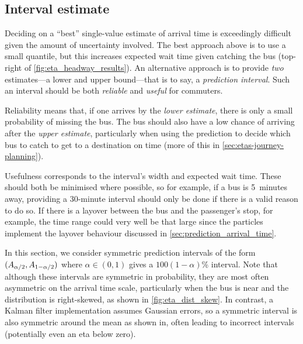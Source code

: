 \subsection{Interval estimate}
\label{sec:etas-interval}


Deciding on a ``best'' single-value estimate of arrival time is exceedingly difficult given the amount of uncertainty involved. The best approach above is to use a small quantile, but this increases expected wait time given catching the bus (top-right of \cref{fig:eta_headway_results}). An alternative approach is to provide \emph{two} estimates---a lower and upper bound---that is to say, a \emph{prediction interval}. Such an interval should be both \emph{reliable} and \emph{useful} for commuters.

Reliability means that, if one arrives by the \emph{lower estimate}, there is only a small probability of missing the bus. The bus should also have a low chance of arriving after the \emph{upper estimate}, particularly when using the prediction to decide which bus to catch to get to a destination on time (more of this in \cref{sec:etas-journey-planning}).

Usefulness corresponds to the interval's width and expected wait time. These should both be minimised where possible, so for example, if a bus is 5~minutes away, providing a 30-minute interval should only be done if there is a valid reason to do so. If there is a layover between the bus and the passenger's stop, for example, the time range could very well be that large since the particles implement the layover behaviour discussed in \cref{sec:prediction_arrival_time}.







In this section, we consider symmetric prediction intervals of the form $(A_{\alpha/2}, A_{1-\alpha/2})$ where $\alpha \in (0,1)$ gives a $100(1-\alpha)$\% interval. Note that although these intervals are symmetric in probability, they are most often asymmetric on the arrival time scale, particularly when the bus is near and the distribution is right-skewed, as shown in \cref{fig:eta_dist_skew}. In contrast, a Kalman filter implementation assumes Gaussian errors, so a symmetric interval is also symmetric around the mean as shown in, often leading to incorrect intervals (potentially even an \gls{eta} below zero).


